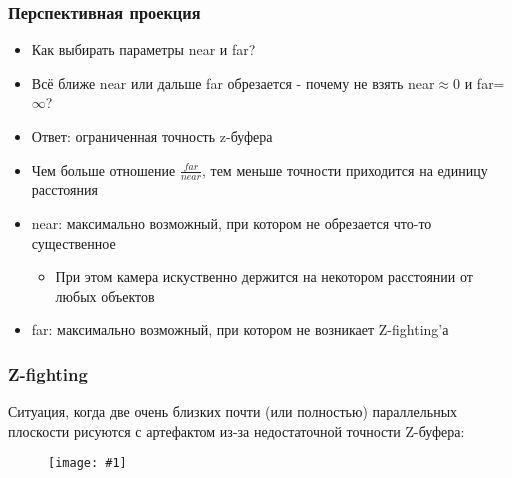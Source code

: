 \documentclass{beamer}
\newcommand{\slideimage}[1]{
  \begin{figure}
    \begin{adjustbox}{width=\textwidth, totalheight=\textheight-2\baselineskip-2\baselineskip,keepaspectratio}
      \texttt{[image: \#1]}
    \end{adjustbox}
  \end{figure}
}
\begin{document}
\begin{frame}[fragile]
\frametitle{Перспективная проекция}
\begin{itemize}
\item Как выбирать параметры near и far?
\pause
\item Всё ближе near или дальше far обрезается - почему не взять near\begin{math}\approx 0\end{math} и far=\begin{math}\infty\end{math}?
\pause
\item Ответ: ограниченная точность z-буфера
\item Чем больше отношение \begin{math}\frac{far}{near}\end{math}, тем меньше точности приходится на единицу расстояния
\pause
\item near: максимально возможный, при котором не обрезается что-то существенное
\begin{itemize}
\item При этом камера искуственно держится на некотором расстоянии от любых объектов
\end{itemize}
\pause
\item far: максимально возможный, при котором не возникает Z-fighting'а
\end{itemize}
\end{frame}

\begin{frame}[fragile]
\frametitle{Z-fighting}
Ситуация, когда две очень близких почти (или полностью) параллельных плоскости рисуются с артефактом из-за недостаточной точности Z-буфера:
\slideimage{z-fighting.png}
\end{frame}
\end{document}

